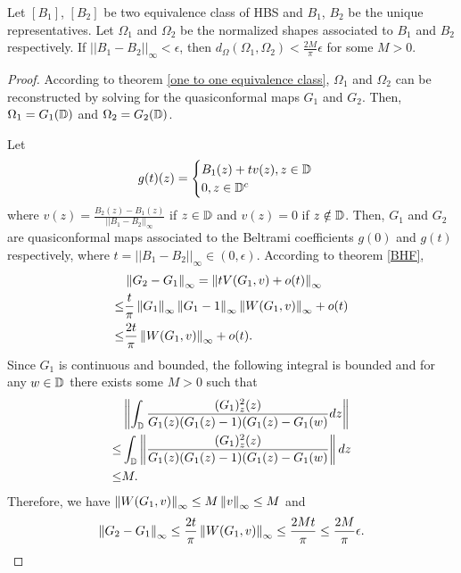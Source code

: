 \documentclass[review,onefignum,onetabnum]{siamonline190516}
\begin{document}
    \begin{theorem}\label{reconstruction robust theorem}
    Let $[B_1]$, $[B_2]$ be two equivalence class of HBS and $B_1$, $B_2$ be the unique representatives. Let $\Omega_1$ and $\Omega_2$ be the normalized shapes associated to $B_1$ and $B_2$ respectively. If 
    $||B_1 - B_2||_{\infty} < \epsilon$, then $d_\Omega(\Omega_1,\Omega_2)<\frac{2M}{\pi}\epsilon$ for some $M>0$.
    \end{theorem}
    \begin{proof}
    According to theorem \ref{one to one equivalence class}, $\Omega_1$ and $\Omega_2$ can be reconstructed by solving for the quasiconformal maps $G_1$ and $G_2$. Then, $\Omega_1 = G_1(\mathbb{D})$ and $\Omega_2 = G_2(\mathbb{D})$.
    
    Let
    \begin{equation}
        g(t)(z) = \begin{cases}
            B_1(z) + t v(z), z \in \mathbb{D} \\
            0, z \in \mathbb{D}^c
        \end{cases}
    \end{equation}
    where $v(z) = \frac{B_2(z) - B_1(z)}{||B_1 - B_2||_{\infty}}$ if $z \in \mathbb{D}$ and $v(z) = 0$ if $z \notin \mathbb{D}$. Then, $G_1$ and $G_2$ are quasiconformal maps associated to the Beltrami coefficients $g(0)$ and $g(t)$ respectively, where $t = ||B_1 - B_2||_{\infty} \in (0, \epsilon)$. According to theorem \ref{BHF},
    \begin{align*}
        &\left\Vert G_2 - G_1 \right\Vert_\infty = \left\Vert t V(G_1, v) + o(t) \right\Vert_\infty \\
        \le& \frac{t}{\pi}\left\Vert G_1 \right\Vert_\infty \left\Vert G_1 - 1 \right\Vert_\infty \left\Vert W(G_1, v) \right\Vert_\infty + o(t)\\
        \le& \frac{2t}{\pi} \left\Vert W(G_1, v) \right\Vert_\infty + o(t).
    \end{align*}
    Since $G_1$ is continuous and bounded, the following integral is bounded and for any $w \in \mathbb{D}$ there exists some $M > 0$ such that
    \begin{equation}
    \begin{split}
        &\left\Vert \int_{\mathbb{D}} \frac{(G_1)_z^2(z)}{G_1(z)(G_1(z)-1)(G_1(z)-G_1(w)}dz \right\Vert \\
        \le& \int_{\mathbb{D}} \left\Vert \frac{(G_1)_z^2(z)}{G_1(z)(G_1(z)-1)(G_1(z)-G_1(w)} \right\Vert dz \\
        \le& M.
    \end{split}
    \end{equation}
    Therefore, we have $\left\Vert W(G_1, v) \right\Vert_\infty \le M \left\Vert v \right\Vert_\infty \le M$ and
    \begin{equation}
        \left\Vert G_2 - G_1 \right\Vert_\infty \le \frac{2t}{\pi} \left\Vert W(G_1, v) \right\Vert_\infty \le \frac{2Mt}{\pi} \le \frac{2M}{\pi} \epsilon.
    \end{equation}
    

\end{proof}
\end{document}
